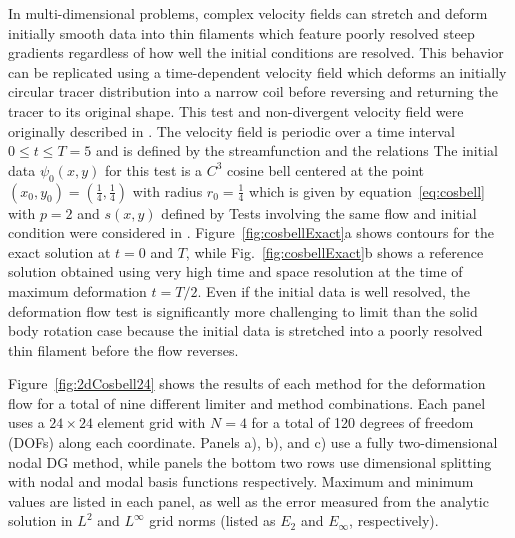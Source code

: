 \documentclass{ametsoc}
\begin{document}
In multi-dimensional problems, complex velocity fields can stretch and deform initially smooth data into thin filaments which feature poorly resolved steep gradients regardless of how well the initial conditions are resolved. This behavior can be replicated using a time-dependent velocity field which deforms an initially circular tracer distribution into a narrow coil before reversing and returning the tracer to its original shape. This test and non-divergent velocity field were originally described in \citep{LeVeque1996}. The velocity field is periodic over a time interval $0 \leq t \leq T=5$ and is defined by the streamfunction
and the relations
The initial data $\psi_0(x,y)$ for this test is a $C^3$ cosine bell centered at the point $(x_0,y_0) = (\frac{1}{4},\frac{1}{4})$ with radius $r_0 = \frac{1}{4}$ which is given by equation~\eqref{eq:cosbell} with $p=2$ and $s(x,y)$ defined by
%
Tests involving the same flow and initial condition were considered in \citep{ullrich2014}. Figure~\ref{fig:cosbellExact}a shows contours for the exact solution at $t=0$ and $T$, while Fig.~\ref{fig:cosbellExact}b shows a reference solution obtained using very high time and space resolution at the time of maximum deformation $t=T/2$. Even if the initial data is well resolved, the deformation flow test is significantly more challenging to limit than the solid body rotation case because the initial data is stretched into a poorly resolved thin filament before the flow reverses. 

Figure~\ref{fig:2dCosbell24} shows the results of each method for the deformation flow for a total of nine different limiter and method combinations. Each panel uses a $24 \times 24$ element grid with $N=4$ for a total of 120 degrees of freedom (DOFs) along each coordinate. Panels a), b), and c) use a fully two-dimensional nodal DG method, while panels the bottom two rows use dimensional splitting with nodal and modal basis functions respectively. Maximum and minimum values are listed in each panel, as well as the error measured from the analytic solution in $L^2$ and $L^{\infty}$ grid norms (listed as $E_2$ and $E_{\infty}$, respectively).
\end{document}
